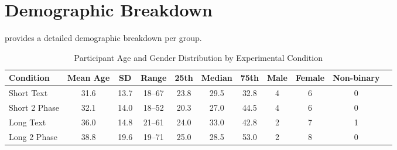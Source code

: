 \section{Demographic Breakdown}
\label{sec:apdx:demo}
 provides a detailed demographic breakdown per group.
\begin{table*}[h!]
\centering
\caption{Participant Age and Gender Distribution by Experimental Condition}
\label{tab:age_gender_distribution}
\begin{tabular}{lcccccccccc}
\hline
\textbf{Condition} & \textbf{Mean Age} & \textbf{SD} & \textbf{Range} & \textbf{25th} & \textbf{Median} & \textbf{75th} & \textbf{Male} & \textbf{Female} & \textbf{Non-binary} \\
\hline
Short Text      & 31.6  & 13.7 & 18--67 & 23.8 & 29.5 & 32.8 & 4 & 6 & 0 \\
Short 2 Phase   & 32.1  & 14.0 & 18--52 & 20.3 & 27.0 & 44.5 & 4 & 6 & 0 \\
Long Text       & 36.0  & 14.8 & 21--61 & 24.0 & 33.0 & 42.8 & 2 & 7 & 1 \\
Long 2 Phase    & 38.8  & 19.6 & 19--71 & 25.0 & 28.5 & 53.0 & 2 & 8 & 0 \\
\hline
\end{tabular}
\end{table*}
